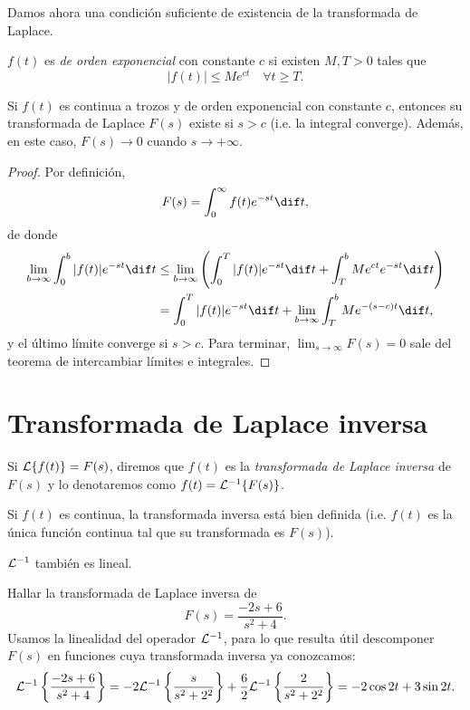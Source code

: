 \documentclass[../ecuaciones_diferenciales.tex]{subfiles}
\begin{document}
Damos ahora una condición suficiente de existencia de la transformada de Laplace.

\begin{definition}
	\(f(t)\) es \emph{de orden exponencial} con constante \(c\) si existen \(M, T
	> 0\) tales que
	\[|f(t)| \leq Me^{ct} \quad \forall t \geq T.\]
\end{definition}

\begin{theorem}
	Si \(f(t)\) es continua a trozos y de orden exponencial con constante \(c\),
	entonces su transformada de Laplace \(F(s)\) existe si \(s > c\) (i.e. la
	integral converge). Además, en este caso, \(F(s) \to 0\) cuando \(s \to +\infty\).
	\begin{proof}
		Por definición,
		\[F(s) = \int_0^\infty f(t)e^{-st} \dif t,\]
		de donde
		\begin{align*}
			\lim_{b \to \infty} \int_0^b |f(t)|e^{-st} \dif t
			 & \leq \lim_{b \to \infty} \left( \int_0^T |f(t)|e^{-st} \dif t
			+ \int_T^b Me^{ct}e^{-st} \dif t \right)                         \\
			 & = \int_0^T |f(t)|e^{-st} \dif t + \lim_{b \to \infty}
			\int_T^b Me^{-(s-c)t} \dif t,
		\end{align*}
		y el último límite converge si \(s>c\). Para terminar,
		\(\lim_{s \to \infty} F(s) = 0\) sale del teorema de intercambiar
		límites e integrales.
	\end{proof}
\end{theorem}

\section{Transformada de Laplace inversa}
Si \(\mathcal{L}\{f(t)\} = F(s)\), diremos que \(f(t)\) es la \emph{transformada de
	Laplace inversa} de \(F(s)\) y lo denotaremos como \(f(t) = \mathcal{L}^{-1}\{F(s)\}\).

\begin{remark}
	Si \(f(t)\) es continua, la transformada inversa está bien definida
	(i.e. \(f(t)\) es la única función continua tal que su transformada es \(F(s)\)).
\end{remark}

\begin{remark}
	\(\mathcal{L}^{-1}\) también es lineal.
\end{remark}

\begin{example}
	Hallar la transformada de Laplace inversa de
	\[F(s) = \frac{-2s+6}{s^2+4}.\]
	Usamos la linealidad del operador \(\mathcal{L}^{-1}\), para lo que resulta útil
	descomponer \(F(s)\) en funciones cuya transformada inversa ya conozcamos:
	\[\mathcal{L}^{-1}\left\{\frac{-2s+6}{s^2+4}\right\} =
		-2\mathcal{L}^{-1}\left\{\frac{s}{s^2+2^2}\right\} +
		\frac{6}{2}\mathcal{L}^{-1}\left\{\frac{2}{s^2+2^2}\right\} = -2 \cos 2t + 3 \sin 2t.\]
\end{example}
\end{document}
